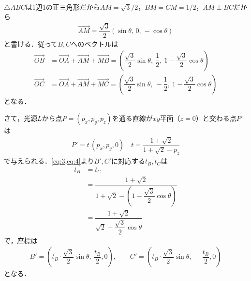 \documentclass[../../main.tex]{subfiles}
\begin{document}
$\triangle ABC$は1辺1の正三角形だから$AM=\sqrt{3}/2$，$BM=CM=1/2$，$AM\perp BC$だから
\begin{align}
  \overrightarrow{AM}=\dfrac{\sqrt{3}}{2}(\sin\theta,\,0,\,-\cos\theta) \label{eq:2}
\end{align}
と書ける．従って$B,C$へのベクトルは
\begin{align}
  \overrightarrow{OB}&=\overrightarrow{OA}+\overrightarrow{AM}+\overrightarrow{MB}=\left(\dfrac{\sqrt{3}}{2}\sin\theta,\ \dfrac{1}{2},\ 1-\dfrac{\sqrt{3}}{2}\cos\theta\right) \label{eq:3}\\
  \overrightarrow{OC}&=\overrightarrow{OA}+\overrightarrow{AM}+\overrightarrow{MC}
  =\left(\dfrac{\sqrt{3}}{2}\sin\theta,\ -\dfrac{1}{2},\ 1-\dfrac{\sqrt{3}}{2}\cos\theta\right) \label{eq:4}
\end{align}
となる．

さて，光源$L$から点$P=(p_x,p_y,p_z)$を通る直線が$xy$平面（$z=0$）と交わる点$P'$は
\begin{align}
  P'=t\,(p_x,p_y,0) \quad t=\dfrac{1+\sqrt{2}}{1+\sqrt{2}-p_z}
\end{align}
で与えられる．\cref{eq:3,eq:4}より$B',C'$に対応する$t_B,t_C$は
\begin{align}
  t_B
  &=t_C \\
  &=\dfrac{1+\sqrt{2}}{1+\sqrt{2}-\left(1-\dfrac{\sqrt{3}}{2}\cos\theta\right)} \\
  &=\dfrac{1+\sqrt{2}}{\sqrt{2}+\dfrac{\sqrt{3}}{2}\cos\theta} \label{eq:5}
\end{align}
で，座標は
\begin{align}
  B'=\left(t_B\cdot\dfrac{\sqrt{3}}{2}\sin\theta,\ \dfrac{t_B}{2},0\right),\qquad
  C'=\left(t_B\cdot\dfrac{\sqrt{3}}{2}\sin\theta,\ -\dfrac{t_B}{2},0\right) \label{eq:6}
\end{align}
となる．
\end{document}
